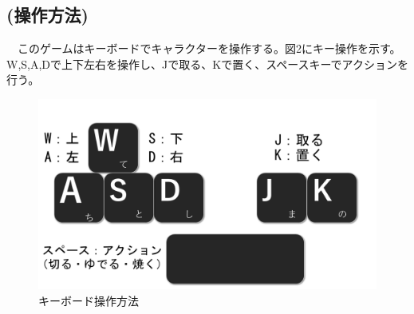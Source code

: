 \documentclass[a4j]{jarticle} %
\begin{document}
\subsection*{(操作方法)}
　このゲームはキーボードでキャラクターを操作する。図2にキー操作を示す。W,S,A,Dで上下左右を操作し、Jで取る、Kで置く、スペースキーでアクションを行う。
\begin{figure}[H]
  \begin{center}
  \includegraphics[scale=0.2]{img/key.png}
  \caption{キーボード操作方法}
  \end{center}
\end{figure}
\end{document}
